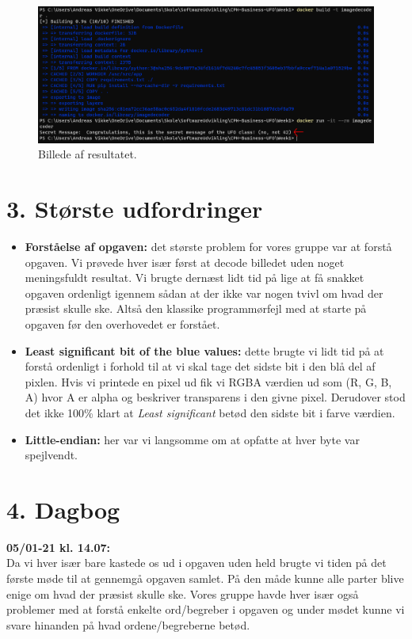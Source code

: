 \documentclass[10pt]{report}
\begin{document}
\begin{figure}[H]
  \centering
  \includegraphics[width=\textwidth]{Result.png}
  \caption{Billede af resultatet.}
\end{figure}

\chapter*{3. Største udfordringer}
\pagestyle{fancy}
\begin{itemize}
  \item \textbf{Forståelse af opgaven:} det største problem for vores gruppe var at forstå opgaven. Vi prøvede hver især først at decode billedet uden noget meningsfuldt resultat. Vi brugte dernæst lidt tid på lige at få snakket opgaven ordenligt igennem sådan at der ikke var nogen tvivl om hvad der præsist skulle ske. Altså den klassike programmørfejl med at starte på opgaven før den overhovedet er forstået.
  \item \textbf{Least significant bit of the blue values:} dette brugte vi lidt tid på at forstå ordenligt i forhold til at vi skal tage det sidste bit i den blå del af pixlen. Hvis vi printede en pixel ud fik vi RGBA værdien ud som (R, G, B, A) hvor A er alpha og beskriver transparens i den givne pixel. Derudover stod det ikke 100\% klart at \textit{Least significant} betød den sidste bit i farve værdien.
  \item \textbf{Little-endian:} her var vi langsomme om at opfatte at hver byte var spejlvendt.
\end{itemize}

\chapter*{4. Dagbog}
\pagestyle{fancy}

\noindent\textbf{05/01-21 kl. 14.07:}\\
\noindent Da vi hver især bare kastede os ud i opgaven uden held brugte vi tiden på det første møde til at gennemgå opgaven samlet. På den måde kunne alle parter blive enige om hvad der præsist skulle ske. Vores gruppe havde hver især også problemer med at forstå enkelte ord/begreber i opgaven og under mødet kunne vi svare hinanden på hvad ordene/begreberne betød.
\end{document}
